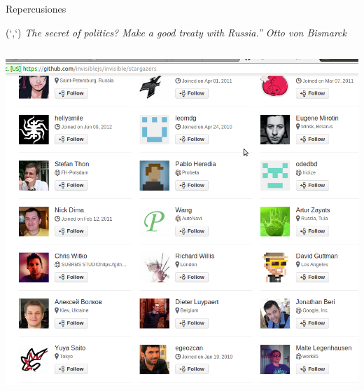 \documentclass[xcolor=dvipsnames, 14pt]{beamer}
\newenvironment{reference}[2]{%
  \begin{textblock*}{\textwidth}(#1,#2)
      \footnotesize\it\bgroup\color{gray!50!black}}{\egroup\end{textblock*}}
\begin{document}
\begin{frame}{Repercusiones}
\begin{reference}{4mm}{13mm}
``The secret of politics? Make a good treaty with Russia.'' Otto von Bismarck
\end{reference}

\begin{columns}[t]

\begin{column}{0.5\textwidth}
    \begin{center}
        \includegraphics[width=\textwidth]{img/github.png}
    \end{center}
\end{column}


\end{columns}
\end{frame}
\end{document}
